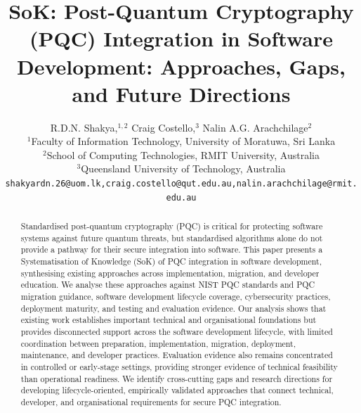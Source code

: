 \documentclass[letterpaper,twocolumn,10pt]{article}
\begin{document}

\date{}

\title{SoK: Post-Quantum Cryptography (PQC) Integration in Software Development: Approaches, Gaps, and Future Directions}

\author{
R.D.N. Shakya,$^{1,2}$ \qquad
Craig Costello,$^{3}$ \qquad
Nalin A.G. Arachchilage$^{2}$ \\
$^{1}$Faculty of Information Technology, University of Moratuwa, Sri Lanka \\
$^{2}$School of Computing Technologies, RMIT University, Australia \\
$^{3}$Queensland University of Technology, Australia \\
\texttt{shakyardn.26@uom.lk,craig.costello@qut.edu.au,nalin.arachchilage@rmit.edu.au}
}

\maketitle
\begin{abstract}

Standardised post-quantum cryptography (PQC) is critical for protecting software systems against future quantum threats, but standardised algorithms alone do not provide a pathway for their secure integration into software. This paper presents a Systematisation of Knowledge (SoK) of PQC integration in software development, synthesising existing approaches across implementation, migration, and developer education. We analyse these approaches against NIST PQC standards and PQC migration guidance, software development lifecycle coverage, cybersecurity practices, deployment maturity, and testing and evaluation evidence. Our analysis shows that existing work establishes important technical and organisational foundations but provides disconnected support across the software development lifecycle, with limited coordination between preparation, implementation, migration, deployment, maintenance, and developer practices. Evaluation evidence also remains concentrated in controlled or early-stage settings, providing stronger evidence of technical feasibility than operational readiness. We identify cross-cutting gaps and research directions for developing lifecycle-oriented, empirically validated approaches that connect technical, developer, and organisational requirements for secure PQC integration.

\end{abstract}
\end{document}
